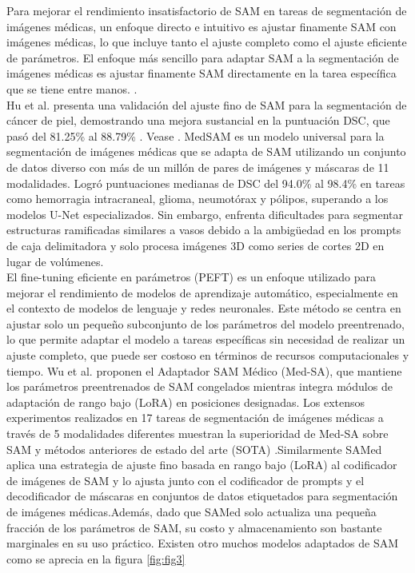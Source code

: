 \documentclass[12pt]{article}
\begin{document}
			
		Para mejorar el rendimiento insatisfactorio de SAM en tareas de segmentación de imágenes médicas, un enfoque directo e intuitivo es ajustar finamente SAM con imágenes médicas, lo que incluye tanto el ajuste completo como el ajuste eficiente de parámetros. El enfoque más sencillo para adaptar SAM a la segmentación de imágenes médicas es ajustar finamente SAM directamente en la tarea específica que se tiene entre manos.
		.
		\\
		
		Hu et al. \cite{Hu2023} presenta una validación del ajuste fino de SAM para la segmentación de cáncer de piel, demostrando una mejora sustancial en la puntuación DSC, que pasó del 81.25\% al 88.79\% . Vease \cite{Zhang2024SegmentAnything}.
		MedSAM \cite{ma2023segment} es un modelo universal para la segmentación de imágenes médicas que se adapta de SAM utilizando un conjunto de datos diverso con más de un millón de pares de imágenes y máscaras de 11 modalidades. Logró puntuaciones medianas de DSC del 94.0\% al 98.4\% en tareas como hemorragia intracraneal, glioma, neumotórax y pólipos, superando a los modelos U-Net especializados. Sin embargo, enfrenta dificultades para segmentar estructuras ramificadas similares a vasos debido a la ambigüedad en los prompts de caja delimitadora y solo procesa imágenes 3D como series de cortes 2D en lugar de volúmenes.
		\\
		
		El fine-tuning eficiente en parámetros (PEFT) es un enfoque utilizado para mejorar el rendimiento de modelos de aprendizaje automático, especialmente en el contexto de modelos de lenguaje y redes neuronales. Este método se centra en ajustar solo un pequeño subconjunto de los parámetros del modelo preentrenado, lo que permite adaptar el modelo a tareas específicas sin necesidad de realizar un ajuste completo, que puede ser costoso en términos de recursos computacionales y tiempo.
		Wu et al. \cite{Wu2023} proponen el Adaptador SAM Médico (Med-SA), que mantiene los parámetros preentrenados de SAM congelados mientras integra módulos de adaptación de rango bajo (LoRA) \cite{Hu2021} en posiciones designadas. Los extensos experimentos realizados en 17 tareas de segmentación de imágenes médicas a través de 5 modalidades diferentes muestran la superioridad de Med-SA sobre SAM y métodos anteriores de estado del arte (SOTA) \cite{Zhang2024SegmentAnything}.Similarmente SAMed \cite{SaMed} aplica una estrategia de ajuste fino basada en rango bajo (LoRA) al codificador de imágenes de SAM y lo ajusta junto con el codificador de prompts y el decodificador de máscaras en conjuntos de datos etiquetados para segmentación de imágenes médicas.Además, dado que SAMed solo actualiza una pequeña fracción de los parámetros de SAM, su costo y almacenamiento son bastante marginales en su uso práctico. Existen otro muchos modelos adaptados de SAM como se aprecia en la figura \ref{fig:fig3} 
			
\end{document}
